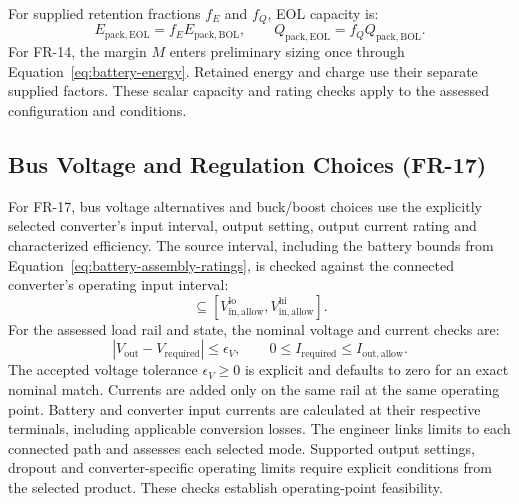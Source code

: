 For supplied retention fractions $f_E$ and $f_Q$, EOL capacity is:
\begin{equation}
    E_{\mathrm{pack,EOL}}=f_EE_{\mathrm{pack,BOL}},
    \qquad Q_{\mathrm{pack,EOL}}=f_QQ_{\mathrm{pack,BOL}}.
    \label{eq:battery-retained-capacity}
\end{equation}
For FR-14, the margin $M$ enters preliminary sizing once through Equation~\eqref{eq:battery-energy}. Retained energy and charge use their separate supplied factors. These scalar capacity and rating checks apply to the assessed configuration and conditions.

\subsection{Bus Voltage and Regulation Choices (FR-17)}
For FR-17, bus voltage alternatives and buck/boost choices use the explicitly selected converter's input interval, output setting, output current rating and characterized efficiency. The source interval, including the battery bounds from Equation~\eqref{eq:battery-assembly-ratings}, is checked against the connected converter's operating input interval:
\begin{equation}
    [V_{\mathrm{src}}^{\mathrm{lo}},V_{\mathrm{src}}^{\mathrm{hi}}]
    \subseteq[V_{\mathrm{in,allow}}^{\mathrm{lo}},V_{\mathrm{in,allow}}^{\mathrm{hi}}].
    \label{eq:converter-input-compatibility}
\end{equation}
For the assessed load rail and state, the nominal voltage and current checks are:
\begin{equation}
    |V_{\mathrm{out}}-V_{\mathrm{required}}|\leq\epsilon_V,
    \qquad 0\leq I_{\mathrm{required}}\leq I_{\mathrm{out,allow}}.
    \label{eq:bus-output-compatibility}
\end{equation}
The accepted voltage tolerance $\epsilon_V\geq0$ is explicit and defaults to zero for an exact nominal match. Currents are added only on the same rail at the same operating point. Battery and converter input currents are calculated at their respective terminals, including applicable conversion losses. The engineer links limits to each connected path and assesses each selected mode. Supported output settings, dropout and converter-specific operating limits require explicit conditions from the selected product. These checks establish operating-point feasibility.


